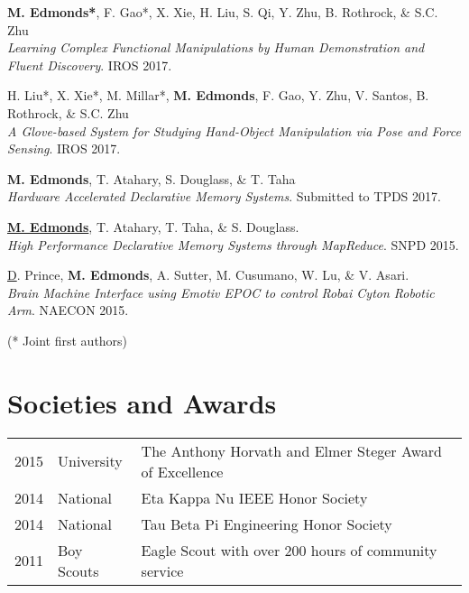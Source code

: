 \documentclass[letterpaper]{deedy-resume} %
\begin{document}
\begin{minipage}[t]{0.66\textwidth}
\textbf{M. Edmonds*}, F. Gao*, X. Xie, H. Liu, S. Qi, Y. Zhu, B. Rothrock, \& S.C. Zhu\\
\textit{Learning Complex Functional Manipulations by Human Demonstration and Fluent Discovery}. IROS 2017.

\vspace{5pt}

H. Liu*, X. Xie*, M. Millar*, \textbf{M. Edmonds}, F. Gao, Y. Zhu, V. Santos, B. Rothrock, \& S.C. Zhu \\
\textit{A Glove-based System for Studying Hand-Object Manipulation via Pose and Force Sensing}. IROS 2017.

\vspace{5pt}

\textbf{M. Edmonds}, T. Atahary, S. Douglass, \& T. Taha\\
\textit{Hardware Accelerated Declarative Memory Systems}. Submitted to TPDS 2017.

\vspace{5pt}

\href{http://ieeexplore.ieee.org/xpl/articleDetails.jsp?arnumber=7176183}
\textbf{M. Edmonds}, T. Atahary, T. Taha, \& S. Douglass. \\
\textit{High Performance Declarative Memory Systems through MapReduce}. SNPD 2015.

\vspace{5pt}

\href{http://ecommons.udayton.edu/cgi/viewcontent.cgi?article=1388&context=ece_fac_pub}
D. Prince, \textbf{M. Edmonds}, A. Sutter, M. Cusumano, W. Lu, \& V. Asari.\\
\textit{Brain Machine Interface using Emotiv EPOC to control Robai Cyton Robotic Arm}. NAECON 2015.


\hfill {\footnotesize (* Joint first authors)}

\sectionspace %


\section{Societies and Awards} 

\begin{tabular}{rll}
2015 & University & The Anthony Horvath and Elmer Steger Award of Excellence \\
2014 & National & Eta Kappa Nu IEEE Honor Society\\
2014 & National & Tau Beta Pi Engineering Honor Society\\
2011 & Boy Scouts & Eagle Scout with over 200 hours of community service\\
\end{tabular}

\sectionspace %


\end{minipage} %
\end{document}
